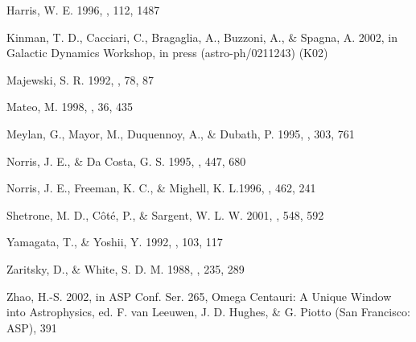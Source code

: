 \documentclass[preprint,12pt]{aastex}
\begin{document}
\begin{thebibliography}{}
 Harris, W. E. 1996, \aj, 112, 1487



 Kinman, T. D., Cacciari, C., Bragaglia, A., Buzzoni, A.,
\& Spagna, A. 2002, in Galactic Dynamics Workshop, in press
(astro-ph/0211243) (K02)


 Majewski, S. R. 1992, \apjs, 78, 87


 Mateo, M. 1998, \araa, 36, 435

 Meylan, G., Mayor, M., Duquennoy, A., \& Dubath, P. 1995,
\aap, 303, 761

 Norris, J. E., \& Da Costa, G. S. 1995, \apj, 447, 680


 Norris, J. E., Freeman, K. C., \& Mighell, K. L.1996,
\apj, 462, 241

 Shetrone, M. D., C\^{o}t\'{e}, P., \& Sargent, W. L. W. 2001,
\apj, 548, 592





 Yamagata, T., \& Yoshii, Y. 1992, \aj, 103, 117

 Zaritsky, D., \& White, S. D. M. 1988, \mnras, 235, 289

 Zhao, H.-S. 2002, in ASP Conf. Ser. 265, Omega Centauri: A
Unique Window into Astrophysics, ed. F. van Leeuwen, J. D. Hughes, \&
G. Piotto (San Francisco: ASP), 391

\end{thebibliography}
\end{document}
